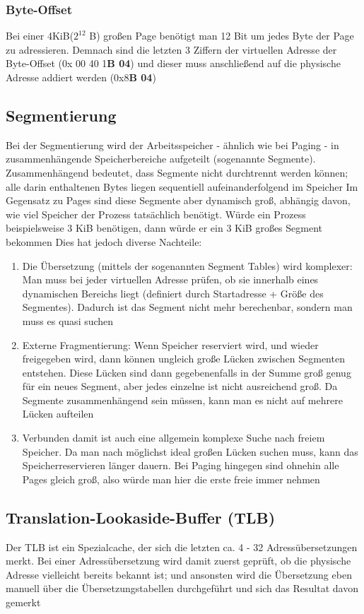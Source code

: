 		\subsubsection{Byte-Offset}
			Bei einer 4KiB($2^{12}$ B) großen Page benötigt man 12 Bit um jedes Byte der Page zu adressieren. Demnach sind die letzten 3 Ziffern der virtuellen Adresse der Byte-Offset (0x 00 40 1\textbf{B 04}) und dieser muss anschließend auf die physische Adresse addiert werden (0x8\textbf{B 04})
	\subsection{Segmentierung}
		Bei der Segmentierung wird der Arbeitsspeicher - ähnlich wie bei Paging - in zusammenhängende Speicherbereiche aufgeteilt (sogenannte Segmente). Zusammenhängend bedeutet, dass Segmente nicht durchtrennt werden können; alle darin enthaltenen Bytes liegen sequentiell aufeinanderfolgend im Speicher \newline \newline
		Im Gegensatz zu Pages sind diese Segmente aber dynamisch groß, abhängig davon, wie viel Speicher der Prozess tatsächlich benötigt. Würde ein Prozess beispielsweise 3 KiB benötigen, dann würde er ein 3 KiB großes Segment bekommen \newline \newline
		Dies hat jedoch diverse Nachteile: 
		\begin{enumerate}
			\item Die Übersetzung (mittels der sogenannten Segment Tables) wird komplexer: Man muss bei jeder virtuellen Adresse prüfen, ob sie innerhalb eines dynamischen Bereichs liegt (definiert durch Startadresse + Größe des Segmentes). Dadurch ist das Segment nicht mehr berechenbar, sondern man muss es quasi suchen
			\item Externe Fragmentierung: Wenn Speicher reserviert wird, und wieder freigegeben wird, dann können ungleich große Lücken zwischen Segmenten entstehen. Diese Lücken sind dann gegebenenfalls in der Summe groß genug für ein neues Segment, aber jedes einzelne ist nicht ausreichend groß. Da Segmente zusammenhängend sein müssen, kann man es nicht auf mehrere Lücken aufteilen
			\item Verbunden damit ist auch eine allgemein komplexe Suche nach freiem Speicher. Da man nach möglichst ideal großen Lücken suchen muss, kann das Speicherreservieren länger dauern. Bei Paging hingegen sind ohnehin alle Pages gleich groß, also würde man hier die erste freie immer nehmen
		\end{enumerate}
	\subsection{Translation-Lookaside-Buffer (TLB)}
		 Der TLB ist ein Spezialcache, der sich die letzten ca. 4 - 32 Adressübersetzungen merkt. Bei einer Adressübersetzung wird damit zuerst geprüft, ob die physische Adresse vielleicht bereits bekannt ist; und ansonsten wird die Übersetzung eben manuell über die Übersetzungstabellen durchgeführt und sich das Resultat davon gemerkt